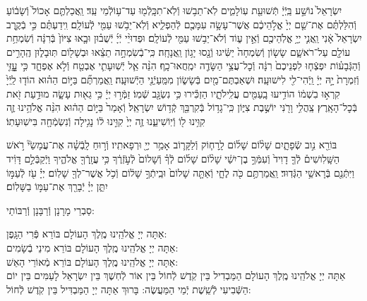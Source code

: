 \documentclass[twoside, openany, parskip=half, 11pt]{book}
\begin{document}
יִשְׂרָאֵל֙ נוֹשַׁ֣ע בַּֽיְֿיָ֔ תְּֿשׁוּעַ֖ת עֽוֹלָמִ֑ים לֹֽא־תֵב֥שׁוּ וְֿלֹֽא־תִכָּֽלְֿמ֖וּ עַד־ע֥וֹלְֿמֵי עַֽד׃
וַֽאֲכַלְתֶּ֤ם אָכוֹל֙ וְֿשָׂב֔וֹעַ וְֿהִלַּלְתֶּ֗ם אֶת־שֵׁ֤ם יְיָ֙ אֱלֹ֣הֵיכֶ֔ם אֲשֶׁר־עָשָׂ֥ה עִמָּכֶ֖ם לְֿהַפְלִ֑יא וְֿלֹֽא־יֵבֹ֥שׁוּ עַמִּ֖י לְֿעוֹלָֽם׃ וִֽידַעְתֶּ֗ם כִּ֣י בְֿקֶ֤רֶב יִשְׂרָאֵל֙ אָ֔נִי וַֽאֲנִ֛י יְיָ֥ אֱלֹֽהֵיכֶ֖ם וְֿאֵ֣ין ע֑וֹד וְֿלֹא־יֵב֥שׁוּ עַמִּ֖י לְֿעוֹלָֽם׃
וּפְדוּיֵ֨י יְֿיָ֜ יְֿשֻׁב֗וּן וּבָ֤אוּ צִיּוֹן֙ בְּֿרִנָּ֔ה וְֿשִׂמְחַ֥ת עוֹלָ֖ם עַל־רֹאשָׁ֑ם שָׂשׂ֤וֹן וְֿשִׂמְחָה֙ יַשִּׂ֔יגוּ וְֿנָ֖סוּ יָג֥וֹן וַֽאֲנָחָֽה׃ כִּֽי־בְֿשִׂמְחָ֣ה תֵצֵ֔אוּ וּבְשָׁל֖וֹם תּֽוּבָל֑וּן הֶֽהָרִ֣ים וְֿהַגְּֿבָע֗וֹת יִפְצְֿח֤וּ לִפְנֵיכֶם֙ רִנָּ֔ה וְֿכׇל־עֲצֵ֥י הַשָּׂדֶ֖ה יִמְֽחֲאוּ־כָֽף׃ הִנֵּ֨ה אֵ֧ל יְֿשֽׁוּעָתִ֛י אֶבְטַ֖ח וְֿלֹ֣א אֶפְחָ֑ד כִּ֣י עׇׇׇָזִּ֤י וְֿזִמְרָת֙ יָ֣הּ יְיָ֔ וַֽיְֿהִי־לִ֖י לִישׁוּעָֽה׃ וּשְׁאַבְתֶּם־מַ֖יִם בְּֿשָׂשׂ֑וֹן מִמַּֽעַיְֿנֵ֖י הַיְֿשׁוּעָֽה׃ וַֽאֲמַרְתֶּ֞ם בַּיּ֣וֹם הַה֗וּא הוֹד֤וּ לַֽיְֿיָ֙ קִרְא֣וּ בִשְׁמ֔וֹ הוֹדִ֥יעוּ בָֽעַמִּ֖ים עֲלִֽילֹתָ֑יו הַזְכִּ֕ירוּ כִּ֥י נִשְׂגָּ֖ב שְֿׁמֽוֹ׃ זַמְּֿר֣וּ יְיָ֔ כִּ֥י גֵא֖וּת עָשָׂ֑ה מוּדַ֥עַת זֹ֖את בְּֿכׇל־הָאָֽרֶץ׃ צַֽהֲלִ֥י וָרֹ֖נִּי יוֹשֶׁ֣בֶת צִיּ֑וֹן כִּֽי־גָד֥וֹל בְּֿקִרְבֵּ֖ךְ קְֿד֥וֹשׁ יִשְׂרָאֵֽל׃ וְֿאָמַר֙ בַּיּ֣וֹם הַה֔וּא הִנֵּ֨ה אֱלֹהֵ֥ינוּ זֶ֛ה קִוִּ֥ינוּ ל֖וֹ וְֿיֽוֹשִׁיעֵ֑נוּ זֶ֤ה יְיָ֙ קִוִּ֣ינוּ ל֔וֹ נָגִ֥ילָה וְֿנִשְׂמְֿחָ֖ה בִּישֽׁוּעָתֽוֹ׃


בּוֹרֵ֖א נִ֣וב שְֿׂפָתָ֑יִם שָׁל֨וֹם שָׁל֜וֹם לָֽרָח֧וֹק וְֿלַקָּר֛וֹב אָמַ֥ר יְיָ֖ וּרְפָאתִֽיו׃ וְֿר֣וּחַ לָֽבְֿשָׁ֗ה אֶת־עֲמָשַׂי֘ רֹ֣אשׁ הַשָּֽׁלִושִׁים֒ לְֿךָ֤ דָוִיד֙ וְֿעִמְּֿךָ֣ בֶן־יִשַׁ֔י שָׁל֨וֹם שָׁל֜וֹם לְֿךָ֗ וְֿשָׁלוֹם֙ לְֿעֹ֣זְֿרֶ֔ךָ כִּ֥י עֲזָֽרְֿךָ֖ אֱלֹהֶ֑יךָ וַיְֿקַבְּֿלֵ֣ם דָּוִ֔יד וַיִּתְּֿנֵ֖ם בְּֿרָאשֵׁ֥י הַגְּֿדֽוּד׃
וַֽאֲמַרְתֶּ֥ם כֹּ֖ה לֶחָ֑י וְֿאַתָּ֤ה שָׁלוֹם֙ וּבֵֽיתְֿךָ֣ שָׁל֔וֹם וְֿכֹ֥ל אֲשֶׁר־לְךָ֖ שָׁלֽוֹם׃ יְיָ֗ עֹ֖ז לְֿעַמּ֣וֹ יִתֵּ֑ן יְיָ֓ יְֿבָרֵ֖ךְ אֶת־עַמּ֣וֹ בַשָּׁלֽוֹם׃

\nextpage


\begin{scriptsize}
סַבְרֵי מָרָנָן וְֿרַבָּנָן וְֿרַבּוֹתַי: \\
\end{scriptsize}
אַתָּה יְיָ אֱלֹהֵֽינוּ מֶֽלֶךְ הָעוֹלָם בּוֹרֵא פְּֿרִי הַגָּֽפֶן: \\
אַתָּה יְיָ אֱלֹהֵֽינוּ מֶֽלֶךְ הָעוֹלָם
בּוֹרֵא מִינֵי בְֿשָׂמִים: \\
אַתָּה יְיָ אֱלֹהֵֽינוּ מֶֽלֶךְ הָעוֹלָם בּוֹרֵא מְֿאוֹרֵי הָאֵשׁ:\\
אַתָּה יְיָ אֱלֹהֵֽינוּ מֶֽלֶךְ הָעוֹלָם הַמַּבְדִיל בֵּין קֹֽדֶשׁ לְֿחוֹל בֵּין אוֹר לְֿחֽשֶׁךְ בֵּין יִשְׂרָאֵל לָעַמִּים בֵּין יוֹם הַשְּֿׁבִיעִי לְֿשֵֽׁשֶׁת יְֿמֵי הַמַּעֲשֶׂה: בָּרוּךְ אַתָּה יְיָ הַמַּבְדִּיל בֵּין קֹֽדֶשׁ לְֿחוֹל:
\end{document}
